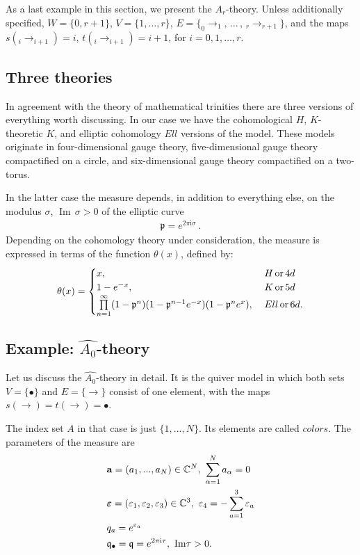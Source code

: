 \documentclass[12pt]{article}
\numberwithin{equation}{section}
\newcommand{\ve}{{\varepsilon}}
\newcommand{\bve}{\boldsymbol{\varepsilon}}
\renewcommand{\Im}{{\operatorname{Im}\,}}
\theoremstyle{definition}
\newcommand {\BC}   {\mathbb C}
\newcommand {\qe} {\mathfrak q}
\newcommand {\ii} {\mathrm{i}}
\begin{document}
As a last example in this section, we present the $A_r$-theory. Unless additionally specified, 
$W = \{ 0, r+1 \}$, $V = \{ 1, \ldots, r \}$, $E = \{ _{0}{\rightarrow}_{1}, \, \ldots \, , \, _{r}{\rightarrow}_{r+1}\}$, and the maps $s(_{i}{\rightarrow}_{i+1}) = i$, $t(_{i}{\rightarrow}_{i+1}) = i+1$, for $i = 0, 1, \ldots, r$. 

\subsection{Three theories}

In agreement with the theory \cite{Arnold:1997} of mathematical trinities
there are three versions of everything worth discussing. In our case we have the cohomological $H$, $K$-theoretic $K$, and elliptic cohomology $Ell$ versions of the model. These models originate in four-dimensional gauge theory, five-dimensional gauge theory compactified on a circle, and six-dimensional gauge theory compactified on a two-torus. 

In the latter case the measure depends, in addition to everything else, on the modulus ${\sigma}$, ${\Im}{\sigma} > 0$ of the elliptic curve
\begin{align*}
    \mathfrak{p} = e^{2 \pi {\ii} \sigma} \ .
\end{align*}
Depending on the  cohomology theory under consideration,  
the measure is expressed in terms  of the function $\theta(x)$, defined by:
\begin{align*}
\theta(x) = 
    \begin{cases}
        x, & \;H\, {\rm or}\, 4d\\
        1 - e^{-x}, & \;K\, {\rm or} \, 5d\\
        \prod\limits_{n = 1}^{\infty} (1 - \frak{p}^{n})(1 - \frak{p}^{n-1} e^{-x})(1 - \frak{p}^{n} e^{x}), & \;Ell\, {\rm or} \, 6d.
    \end{cases}
\end{align*}


\subsection{Example: $\widehat{A_{0}}$-theory}
Let us discuss the $\widehat{A_{0}}$-theory in detail. It is the quiver model in which both 
sets $V = \{ {\bullet} \}$ and $E = \{ {\rightarrow} \}$ consist of one element, with the maps
$s({\rightarrow}) = t({\rightarrow}) = {\bullet}$.  


    The index set $A$ in that case is just $\{1, ..., N\}$. Its elements are called $\textit{colors}$. The parameters of the measure are
\begin{align*}
    & {\bf a} = (a_1 , ..., a_N ) \in {\BC}^{N}, ~ \sum\limits_{\alpha = 1}^{N}a_{\alpha} = 0\\
    &{\bve} = (\varepsilon_{1}, \varepsilon_{2}, \varepsilon_{3}) \in \mathbb{C}^{3}, ~ {\ve}_{4} = - \sum\limits_{a = 1}^{3} \varepsilon_{a}\\
    &q_a = e^{\varepsilon_a}\\
    &\frak{q}_{\bullet} = {\qe} = e^{2 \pi {\ii} \tau}, ~ {\rm Im}\tau > 0.
\end{align*}
\end{document}
